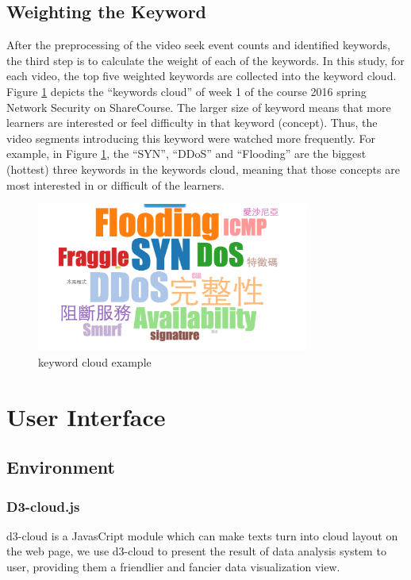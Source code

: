 \subsection{Weighting the Keyword}
After the preprocessing of the video seek event counts and identified keywords, the third step is to calculate the weight of each of the keywords. In this study, for each video, the top five weighted keywords are collected into the keyword cloud.
Figure \ref{fig:keywordcloud} depicts the “keywords cloud” of week 1 of the course 2016 spring Network Security on ShareCourse. The larger size of keyword means that more learners are interested or feel difficulty in that keyword (concept). Thus, the video segments introducing this keyword were watched more frequently.
For example, in Figure \ref{fig:keywordcloud}, the ``SYN'', ``DDoS'' and ``Flooding'' are the biggest (hottest) three keywords in the keywords cloud, meaning that those concepts are most interested in or difficult of the learners.

\begin{figure}[H]
    \centering
    \includegraphics[width = 0.8\textwidth]{fig/wordcloud.png}
    \caption{keyword cloud example}
    \label{fig:keywordcloud}
\end{figure}

\section{User Interface}
\subsection{Environment}
\subsubsection{D3-cloud.js}
d3-cloud \cite{d3cloud} is a JavasCript module which can make texts turn into cloud layout on the web page, we use d3-cloud to present the result of data analysis system to user, providing them a friendlier and fancier data visualization view.
